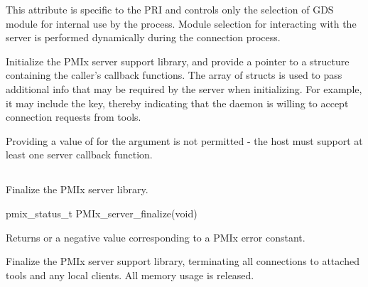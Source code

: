  This attribute is specific to the \ac{PRI} and controls only the selection of \ac{GDS} module for internal use by the process. Module selection for interacting with the server is performed dynamically during the connection process.
\pastePRIAttributeItemEnd{}

\optattrend

\descr

Initialize the \ac{PMIx} server support library, and provide a pointer to a  structure containing the caller's callback functions.
The array of  structs is used to pass additional info that may be required by the server when initializing.
For example, it may include the  key, thereby indicating that the daemon is willing to accept connection requests from tools.

\advicermstart
Providing a value of  for the  argument is not permitted - the host must support at least one server callback function.
\advicermend

\subsection{}

\summary

Finalize the PMIx server library.

\format

\cspecificstart
\begin{codepar}
pmix_status_t
PMIx_server_finalize(void)
\end{codepar}
\cspecificend

Returns  or a negative value corresponding to a PMIx error constant.

\descr

Finalize the \ac{PMIx} server support library, terminating all connections to attached tools and any local clients.
All memory usage is released.

